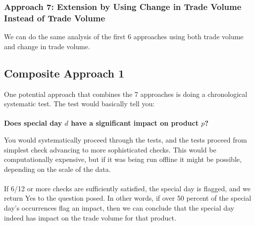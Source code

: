 \documentclass[11pt]{paper}
\begin{document}
\subsubsection*{Approach 7: Extension by Using Change in Trade Volume Instead of Trade Volume}
We can do the same analysis of the first 6 approaches using both trade volume and change in trade volume.

\subsection*{Composite Approach 1}
One potential approach that combines the 7 approaches is doing a chronological systematic test. The test would basically tell you:
\\\\\textbf{Does special day $d$ have a significant impact on product $p$?}
\\


You would systematically proceed through the tests, and the tests proceed from simplest check advancing to more sophisticated checks. This would be computationally expensive, but if it was being run offline it might be possible, depending on the scale of the data. 
\\\\If 6/12 or more checks are sufficiently satisfied, the special day is flagged, and we return Yes to the question posed. In other words, if over 50 percent of the special day's occurrences flag an impact, then we can conclude that the special day indeed has impact on the trade volume for that product.
  
\end{document}
